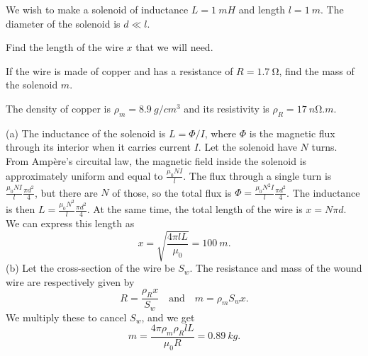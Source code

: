 \documentclass[../TST.tex]{subfiles}
\begin{document}
\begin{pproblem}
We wish to make a solenoid of inductance $L=\qty{1}{mH}$ and length $l=\qty{1}{m}$. The diameter of the solenoid is $d\ll l$.
\begin{subpart}
	\item Find the length of the wire $x$ that we will need. 
	\item If the wire is made of copper and has a resistance of $R=\qty{1.7}{\ohm}$, find the mass of the solenoid $m$. 
\end{subpart}
The density of copper is $\rho_m=\qty{8.9}{g/cm^3}$ and its resistivity is $\rho_R=\qty{17}{n\ohm.m}$.
\end{pproblem}

\ifprob \else
\begin{solution} (a) The inductance of the solenoid is $L=\Phi/I$, where $\Phi$ is the magnetic flux through its interior when it carries current $I$. Let the solenoid have $N$ turns. From Ampère's circuital law, the magnetic field inside the solenoid is approximately uniform and equal to $\frac{\mu_0NI}{l}$. The flux through a single turn is $\frac{\mu_0NI}{l}\frac{\pi d^2}{4}$, but there are $N$ of those, so the total flux is $\Phi = \frac{\mu_0 N^2I}{l}\frac{\pi d^2}{4}$. The inductance is then $L=\frac{\mu_0 N^2}{l}\frac{\pi d^2}{4}$. At the same time, the total length of the wire is $x= N\pi d$. We can express this length as
	\begin{equation*}
		\boxed{x=\sqrt{\frac{4\pi lL}{\mu_0}}=\qty{100}{m}.}
	\end{equation*}
(b) Let the cross-section of the wire be $S_w$. The resistance and mass of the wound wire are respectively given by
\begin{equation*}
R=\frac{\rho_R x}{S_w} \quad \mathrm{and} \quad m=\rho_m S_w x.
\end{equation*}
We multiply these to cancel $S_w$, and we get
\begin{equation*}
	\boxed{m=\frac{4\pi\rho_m\rho_RlL}{\mu_0R}=\qty{0.89}{kg}.}
\end{equation*}

\end{solution}
\fi
\end{document}
